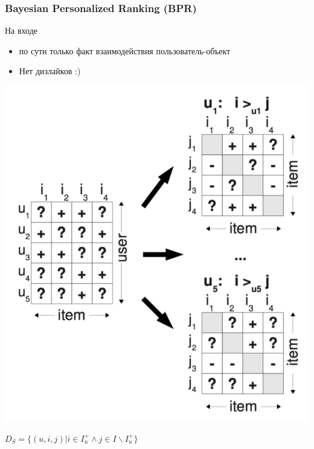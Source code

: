 \documentclass[fullscreen=true, bookmarks=true, hyperref={pdfencoding=unicode}]{beamer}
\begin{document}
\begin{frame}
  \frametitle{Bayesian Personalized Ranking (BPR)}

  На входе
  \begin{itemize}
    \item по сути только факт взаимодействия пользователь-объект
    \item Нет дизлайков :)
  \end{itemize}

  \begin{center}
    \includegraphics[keepaspectratio,
                     width=.4\paperwidth]{BPR.png}
  \end{center}

  $D_S = \{(u,i,j) | i \in I_u^+ \wedge j \in I \backslash I^+_u \}$
\end{frame}
\end{document}
